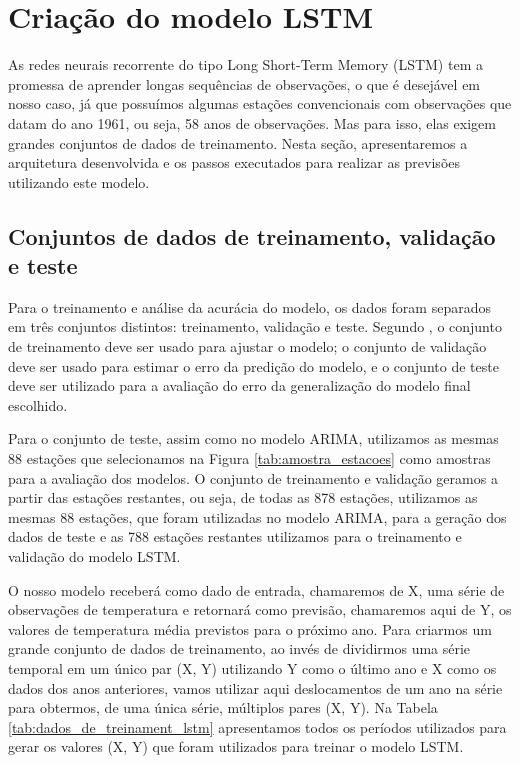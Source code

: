 \section{Criação do modelo LSTM}

As redes neurais recorrente do tipo Long Short-Term Memory (LSTM) tem a promessa de aprender longas sequências de observações, o que é desejável em nosso caso, já que possuímos algumas estações convencionais com observações que datam do ano 1961, ou seja, 58 anos de observações.  Mas para isso, elas exigem grandes conjuntos de dados de treinamento. Nesta seção,  apresentaremos a arquitetura desenvolvida e os passos executados para realizar as previsões utilizando este modelo. 

\subsection{Conjuntos de dados de treinamento, validação e teste}

Para o treinamento e análise da acurácia do modelo, os dados foram separados em três conjuntos distintos: treinamento, validação e teste. Segundo , o conjunto de treinamento deve ser usado para ajustar o modelo; o conjunto de validação deve ser usado para estimar o erro da predição do modelo, e o conjunto de teste deve ser utilizado para a avaliação do erro da generalização do modelo final escolhido. 

Para o conjunto de teste, assim como no modelo ARIMA, utilizamos as mesmas 88 estações que selecionamos na Figura \ref{tab:amostra_estacoes} como amostras para a avaliação dos modelos. O conjunto de treinamento e validação geramos a partir das estações restantes, ou seja, de todas as 878 estações, utilizamos as mesmas 88 estações, que foram utilizadas no modelo ARIMA,  para a geração dos dados de teste e as 788 estações restantes utilizamos para o treinamento e validação do modelo LSTM.

O nosso modelo receberá como dado de entrada, chamaremos de X, uma série de observações de temperatura e retornará como previsão, chamaremos aqui de Y, os valores de temperatura média previstos para o próximo ano. Para criarmos um grande conjunto de dados de treinamento, ao invés de dividirmos uma série temporal em um único par (X, Y) utilizando Y como o último ano e X como os dados dos anos anteriores, vamos utilizar aqui deslocamentos de um ano na série para obtermos, de uma única série, múltiplos pares (X, Y). Na Tabela \ref{tab:dados_de_treinament_lstm} apresentamos todos os períodos utilizados para gerar os valores (X, Y) que foram utilizados para treinar o modelo LSTM. 

